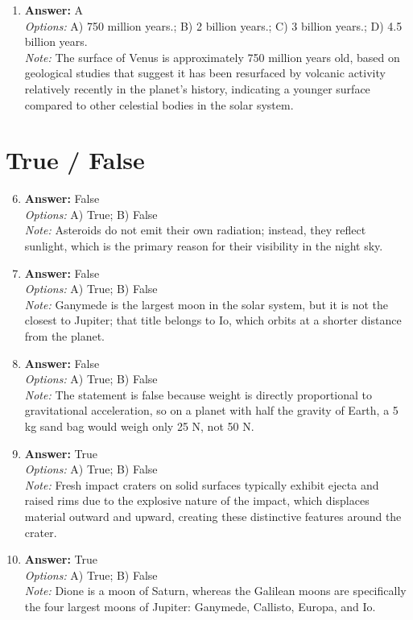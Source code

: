 \documentclass[12pt]{article}
\begin{document}
\begin{enumerate}[label=\arabic*.]
\\ \textit{Note:} One parsec is defined as the distance at which one astronomical unit subtends an angle of one arcsecond as viewed from Earth, establishing a direct relationship between distance and angular measurement in the context of astronomical observations.
\item \textbf{Answer:} A
\\ \textit{Options:} A) 750 million years.; B) 2 billion years.; C) 3 billion years.; D) 4.5 billion years.
\\ \textit{Note:} The surface of Venus is approximately 750 million years old, based on geological studies that suggest it has been resurfaced by volcanic activity relatively recently in the planet's history, indicating a younger surface compared to other celestial bodies in the solar system.
\end{enumerate}

\section*{True / False}
\begin{enumerate}[label=\arabic*.]
\setcounter{enumi}{5}
\item \textbf{Answer:} False
\\ \textit{Options:} A) True; B) False
\\ \textit{Note:} Asteroids do not emit their own radiation; instead, they reflect sunlight, which is the primary reason for their visibility in the night sky.
\item \textbf{Answer:} False
\\ \textit{Options:} A) True; B) False
\\ \textit{Note:} Ganymede is the largest moon in the solar system, but it is not the closest to Jupiter; that title belongs to Io, which orbits at a shorter distance from the planet.
\item \textbf{Answer:} False
\\ \textit{Options:} A) True; B) False
\\ \textit{Note:} The statement is false because weight is directly proportional to gravitational acceleration, so on a planet with half the gravity of Earth, a 5 kg sand bag would weigh only 25 N, not 50 N.
\item \textbf{Answer:} True
\\ \textit{Options:} A) True; B) False
\\ \textit{Note:} Fresh impact craters on solid surfaces typically exhibit ejecta and raised rims due to the explosive nature of the impact, which displaces material outward and upward, creating these distinctive features around the crater.
\item \textbf{Answer:} True
\\ \textit{Options:} A) True; B) False
\\ \textit{Note:} Dione is a moon of Saturn, whereas the Galilean moons are specifically the four largest moons of Jupiter: Ganymede, Callisto, Europa, and Io.
\end{enumerate}
\end{document}
